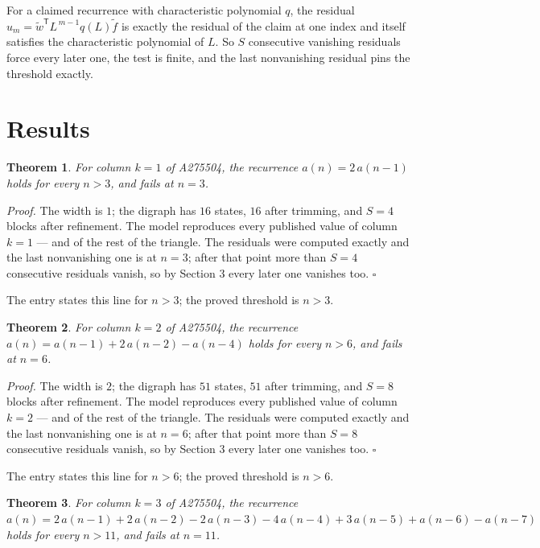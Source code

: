 \documentclass[11pt]{article}
\newtheorem{theorem}{Theorem}
\theoremstyle{definition}
\begin{document}
For a claimed recurrence with characteristic polynomial $q$, the residual $u_m = \tilde w^{\mathsf T}L^{\,m-1}q(L)\tilde f$ is exactly the residual of the claim at one index and itself satisfies the characteristic polynomial of $L$. So $S$ consecutive vanishing residuals force every later one, the test is finite, and the last nonvanishing residual pins the threshold exactly.

\section{Results}

\begin{theorem} For column $k = 1$ of A275504, the recurrence $a(n) = 2\,a(n-1)$ holds for every $n > 3$, and fails at $n = 3$.\end{theorem}

{\itshape Proof.} The width is $1$; the digraph has $16$ states, $16$ after trimming, and $S = 4$ blocks after refinement. The model reproduces every published value of column $k = 1$ --- and of the rest of the triangle. The residuals were computed exactly and the last nonvanishing one is at $n = 3$; after that point more than $S = 4$ consecutive residuals vanish, so by Section 3 every later one vanishes too. $\square$

The entry states this line for $n > 3$; the proved threshold is $n > 3$.

\begin{theorem} For column $k = 2$ of A275504, the recurrence $a(n) = a(n-1) + 2\,a(n-2) - a(n-4)$ holds for every $n > 6$, and fails at $n = 6$.\end{theorem}

{\itshape Proof.} The width is $2$; the digraph has $51$ states, $51$ after trimming, and $S = 8$ blocks after refinement. The model reproduces every published value of column $k = 2$ --- and of the rest of the triangle. The residuals were computed exactly and the last nonvanishing one is at $n = 6$; after that point more than $S = 8$ consecutive residuals vanish, so by Section 3 every later one vanishes too. $\square$

The entry states this line for $n > 6$; the proved threshold is $n > 6$.

\begin{theorem} For column $k = 3$ of A275504, the recurrence $a(n) = 2\,a(n-1) + 2\,a(n-2) - 2\,a(n-3) - 4\,a(n-4) + 3\,a(n-5) + a(n-6) - a(n-7)$ holds for every $n > 11$, and fails at $n = 11$.\end{theorem}
\end{document}
